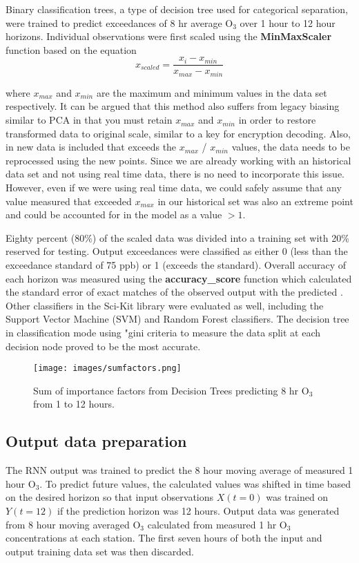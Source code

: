 \documentclass[preprint,12pt,authoryear]{elsarticle}
\begin{document}
\begin{linenumbers}
Binary classification trees, a type of decision tree used for categorical separation,  were trained to predict exceedances of 8 hr average O$_{3}$ over 1 hour to 12 hour horizons. Individual observations were first scaled using the \textbf{MinMaxScaler} function based on the equation
%
\begin{equation}
\label{eq:MaxMin}
x_{scaled} = \frac{x_{i} - x_{min}}{x_{max} - x_{min}}
\end{equation}
%

where $x_{max}$ and $x_{min}$ are the maximum and minimum values in the data set respectively. It can be argued that this method also suffers from legacy biasing similar to PCA in that you must retain $x_{max}$ and $x_{min}$ in order to restore transformed data to original scale, similar to a key for encryption decoding. Also, in new data is included that exceeds the $x_{max}$ / $x_{min}$ values, the data needs to be reprocessed using the new points. Since we are already working with an historical data set and not using real time data, there is no need to incorporate this issue. However, even if we were using real time data, we could safely assume that any value measured that exceeded $x_{max}$ in our historical set was also an extreme point and could be accounted for in the model as a value $>1$. 

Eighty percent (80\%) of the scaled data was divided into a training set with 20\% reserved for testing.  Output exceedances were classified as either 0 (less than the exceedance standard of 75 ppb) or 1 (exceeds the standard). Overall accuracy of each horizon was measured using the \textbf{accuracy\_score} function which calculated the standard error of exact matches of the observed output with the predicted \citep{Raschka2016}.  Other classifiers in the Sci-Kit library were evaluated as well, including the Support Vector Machine (SVM) and Random Forest classifiers. The decision tree in classification mode using "gini criteria to measure the data split at each decision node proved to be the most accurate.

%
\begin{figure}[H]
\centering
\texttt{[image: images/sumfactors.png]}  %
\caption{Sum of importance factors from Decision Trees predicting 8 hr O$_{3}$ from 1 to 12 hours.}
\label{fig:importance}
\end{figure}
%

\subsection{Output data preparation}
The RNN output was trained to predict the 8 hour moving average of measured 1 hour O$_{3}$. To predict future values, the calculated values was shifted in time based on the desired horizon so that input observations $X(t=0)$ was trained on $Y(t=12)$ if the prediction horizon was 12 hours. Output data was generated from 8 hour moving averaged O$_{3}$ calculated from measured 1 hr O$_{3}$ concentrations at each station. The first seven hours of both the input and output training data set was then discarded. 


\end{linenumbers}
\end{document}
